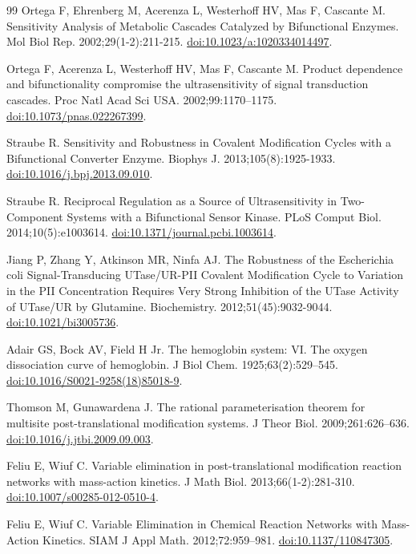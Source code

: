 \documentclass[10pt,letterpaper]{article}
\begin{document}
\begin{singlespace}
\begin{thebibliography}{99}
Ortega F, Ehrenberg M, Acerenza L, Westerhoff HV, Mas F, Cascante M. Sensitivity Analysis of Metabolic Cascades Catalyzed by Bifunctional Enzymes. Mol Biol Rep. 2002;29(1-2):211-215. \href{https://doi.org/10.1023/a:1020334014497}{doi:10.1023/a:1020334014497}.

Ortega F, Acerenza L, Westerhoff HV, Mas F, Cascante M. Product dependence and bifunctionality compromise the ultrasensitivity of signal transduction cascades. Proc Natl Acad Sci USA. 2002;99:1170--1175. \href{https://doi.org/10.1073/pnas.022267399}{doi:10.1073/pnas.022267399}.

Straube R. Sensitivity and Robustness in Covalent Modification Cycles with a Bifunctional Converter Enzyme. Biophys J. 2013;105(8):1925-1933. \href{https://doi.org/10.1016/j.bpj.2013.09.010}{doi:10.1016/j.bpj.2013.09.010}.

Straube R. Reciprocal Regulation as a Source of Ultrasensitivity in Two-Component Systems with a Bifunctional Sensor Kinase. PLoS Comput Biol. 2014;10(5):e1003614. \href{https://doi.org/10.1371/journal.pcbi.1003614}{doi:10.1371/journal.pcbi.1003614}.

Jiang P, Zhang Y, Atkinson MR, Ninfa AJ. The Robustness of the Escherichia coli Signal-Transducing UTase/UR-PII Covalent Modification Cycle to Variation in the PII Concentration Requires Very Strong Inhibition of the UTase Activity of UTase/UR by Glutamine. Biochemistry. 2012;51(45):9032-9044. \href{https://doi.org/10.1021/bi3005736}{doi:10.1021/bi3005736}.

Adair GS, Bock AV, Field H Jr. The hemoglobin system: VI. The oxygen dissociation curve of hemoglobin. J Biol Chem. 1925;63(2):529--545. \href{https://doi.org/10.1016/S0021-9258(18)85018-9}{doi:10.1016/S0021-9258(18)85018-9}.

Thomson M, Gunawardena J. The rational parameterisation theorem for multisite post-translational modification systems. J Theor Biol. 2009;261:626--636. \href{https://doi.org/10.1016/j.jtbi.2009.09.003}{doi:10.1016/j.jtbi.2009.09.003}.

Feliu E, Wiuf C. Variable elimination in post-translational modification reaction networks with mass-action kinetics. J Math Biol. 2013;66(1-2):281-310. \href{https://doi.org/10.1007/s00285-012-0510-4}{doi:10.1007/s00285-012-0510-4}.

Feliu E, Wiuf C. Variable Elimination in Chemical Reaction Networks with Mass-Action Kinetics. SIAM J Appl Math. 2012;72:959--981. \href{https://doi.org/10.1137/110847305}{doi:10.1137/110847305}.


\end{thebibliography}
\end{singlespace}
\end{document}
